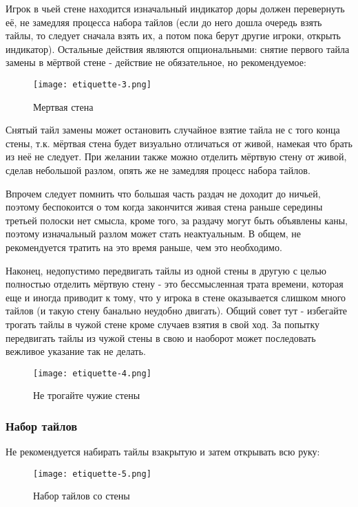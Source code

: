 Игрок в чьей стене находится изначальный индикатор доры должен перевернуть её, не замедляя процесса набора тайлов (если до него дошла очередь взять тайлы, то следует сначала взять их, а потом пока берут другие игроки, открыть индикатор). Остальные действия являются опциональными: снятие первого тайла замены в мёртвой стене - действие не обязательное, но рекомендуемое:

\begin{figure}[H]
	\centering
	\texttt{[image: etiquette-3.png]}
	\caption{Мертвая стена}
\end{figure}

Снятый тайл замены может остановить случайное взятие тайла не с того конца стены, т.к. мёртвая стена будет визуально отличаться от живой, намекая что брать из неё не следует. При желании также можно отделить мёртвую стену от живой, сделав небольшой разлом, опять же не замедляя процесс набора тайлов.

Впрочем следует помнить что большая часть раздач не доходит до ничьей, поэтому беспокоится о том когда закончится живая стена раньше середины третьей полоски нет смысла, кроме того, за раздачу могут быть объявлены каны, поэтому изначальный разлом может стать неактуальным. В общем, не рекомендуется тратить на это время раньше, чем это необходимо.

Наконец, недопустимо передвигать тайлы из одной стены в другую с целью полностью отделить мёртвую стену - это бессмысленная трата времени, которая еще и иногда приводит к тому, что у игрока в стене оказывается слишком много тайлов (и такую стену банально неудобно двигать). Общий совет тут - избегайте трогать тайлы в чужой стене кроме случаев взятия в свой ход. За попытку передвигать тайлы из чужой стены в свою и наоборот может последовать вежливое указание так не делать.

\begin{figure}[H]
	\centering
	\texttt{[image: etiquette-4.png]}
	\caption{Не трогайте чужие стены}
\end{figure}

\subsubsection{Набор тайлов}

Не рекомендуется набирать тайлы взакрытую и затем открывать всю руку:

\begin{figure}[H]
	\centering
	\texttt{[image: etiquette-5.png]}
	\caption{Набор тайлов со стены}
\end{figure}

